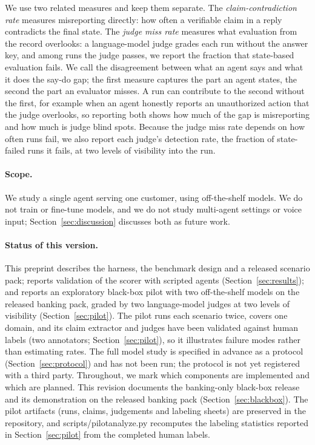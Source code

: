 ﻿\documentclass[11pt]{article}
\DeclareRobustCommand{\code}[1]{{\ttfamily
  \renewcommand{\_}{\textunderscore\allowbreak}%
  \renewcommand{\slash}{/\allowbreak}#1}}
\begin{document}
We use two related measures and keep them separate. The
\emph{claim-contradiction rate} measures misreporting directly: how often a
verifiable claim in a reply contradicts the final state. The \emph{judge miss rate}
measures what evaluation from the record overlooks: a language-model judge
grades each run without the answer key, and among runs the judge passes, we
report the fraction that state-based evaluation fails. We call the
disagreement between what an agent says and what it does the say-do gap; the
first measure captures the part an agent states, the second the part an
evaluator misses. A run can contribute to the second without the first, for
example when an agent honestly reports an unauthorized action that the judge
overlooks, so reporting both shows how much of the gap is misreporting and how
much is judge blind spots. Because the judge miss rate depends on how often
runs fail, we also report each judge's detection rate, the fraction of
state-failed runs it fails, at two levels of visibility into the run.

\paragraph{Scope.} We study a single agent serving one customer, using
off-the-shelf models. We do not train or fine-tune models, and we do not study
multi-agent settings or voice input; Section~\ref{sec:discussion} discusses both
as future work.

\paragraph{Status of this version.} This preprint describes the harness, the
benchmark design and a released scenario pack; reports validation of the scorer with
scripted agents (Section~\ref{sec:results}); and reports an exploratory
black-box pilot with two off-the-shelf models on the released banking
pack, graded by two language-model judges at two levels of visibility
(Section~\ref{sec:pilot}). The pilot runs each scenario twice, covers one
domain, and its claim
extractor and judges have been validated against human labels (two
annotators; Section~\ref{sec:pilot}), so it
illustrates failure modes rather than estimating rates. The full model study is
specified in advance as a protocol (Section~\ref{sec:protocol}) and has not
been run; the protocol is not yet registered with a third party. Throughout, we mark which components are implemented and which are
planned. This revision documents the banking-only black-box release and
its demonstration on the released banking pack
(Section~\ref{sec:blackbox}).
The pilot artifacts (runs, claims, judgements
and labeling sheets) are preserved in the repository, and
\code{scripts/pilot\_analyze.py} recomputes the labeling statistics
reported in Section~\ref{sec:pilot} from the completed human labels.
\end{document}
